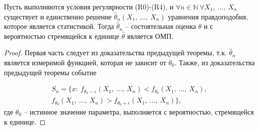 \begin{corollary}
    Пусть выполняются условия регулярности (R0)-(R4), и $\displaystyle \forall n\in \mathbb{N} \ \forall X_{1} ,\ \dotsc ,\ X_{n}$ существует и единственно решение $\displaystyle \hat{\theta }_{n}( X_{1} ,\ \dotsc ,\ X_{n})$ уравнения правдоподобия, которое является статистикой. Тогда $\displaystyle \hat{\theta }_{n}$ -- состоятельная оценка $\displaystyle \theta $ и с вероятностью стремящейся к единице $\displaystyle \hat{\theta }$ является ОМП.
\end{corollary}
\begin{proof}
    Первая часть следует из доказательства предыдущей теоремы, т.к. $\displaystyle \hat{\theta }_{n}$ является измеримой функцией, которая не зависит от $\displaystyle \theta _{0}$. Также, из доказательства предыдущей теоремы событие
    
    
    \begin{gather*}
    S_{n} =\{x:\ f_{\theta _{0} -\varepsilon }( X_{1} ,\ \dotsc ,\ X_{n}) < f_{\theta _{0}}( X_{1} ,\ \dotsc ,\ X_{n}) ,\\
    f_{\theta _{0}}( X_{1} ,\ \dotsc ,\ X_{n})  >f_{\theta _{0} +\varepsilon }( X_{1} ,\ \dotsc ,\ X_{n})\} ,
    \end{gather*}
    где $\displaystyle \theta _{0}$ -- истинное значение параметра, выполняется с вероятностью, стремящейся к единице.
    
    
    
    
    
    
    
\end{proof}
